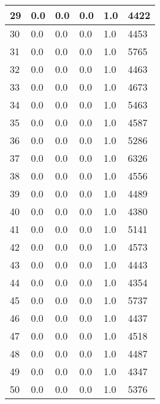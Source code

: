 \begin{longtable}{|l|l|l|l|l|l|}
29 & 0.0 & 0.0 & 0.0 & 1.0 & 4422 \\ \hline 
30 & 0.0 & 0.0 & 0.0 & 1.0 & 4453 \\ \hline 
31 & 0.0 & 0.0 & 0.0 & 1.0 & 5765 \\ \hline 
32 & 0.0 & 0.0 & 0.0 & 1.0 & 4463 \\ \hline 
33 & 0.0 & 0.0 & 0.0 & 1.0 & 4673 \\ \hline 
34 & 0.0 & 0.0 & 0.0 & 1.0 & 5463 \\ \hline 
35 & 0.0 & 0.0 & 0.0 & 1.0 & 4587 \\ \hline 
36 & 0.0 & 0.0 & 0.0 & 1.0 & 5286 \\ \hline 
37 & 0.0 & 0.0 & 0.0 & 1.0 & 6326 \\ \hline 
38 & 0.0 & 0.0 & 0.0 & 1.0 & 4556 \\ \hline 
39 & 0.0 & 0.0 & 0.0 & 1.0 & 4489 \\ \hline 
40 & 0.0 & 0.0 & 0.0 & 1.0 & 4380 \\ \hline 
41 & 0.0 & 0.0 & 0.0 & 1.0 & 5141 \\ \hline 
42 & 0.0 & 0.0 & 0.0 & 1.0 & 4573 \\ \hline 
43 & 0.0 & 0.0 & 0.0 & 1.0 & 4443 \\ \hline 
44 & 0.0 & 0.0 & 0.0 & 1.0 & 4354 \\ \hline 
45 & 0.0 & 0.0 & 0.0 & 1.0 & 5737 \\ \hline 
46 & 0.0 & 0.0 & 0.0 & 1.0 & 4437 \\ \hline 
47 & 0.0 & 0.0 & 0.0 & 1.0 & 4518 \\ \hline 
48 & 0.0 & 0.0 & 0.0 & 1.0 & 4487 \\ \hline 
49 & 0.0 & 0.0 & 0.0 & 1.0 & 4347 \\ \hline 
50 & 0.0 & 0.0 & 0.0 & 1.0 & 5376 \\ \hline 
\end{longtable}
